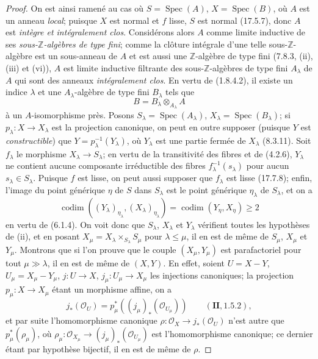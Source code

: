 \begin{proof}
On est ainsi ramené au cas où $S=\operatorname{Spec}(A)$,
$X=\operatorname{Spec}(B)$, où $A$ est un anneau \emph{local}; puisque $X$ est
normal et $f$ lisse, $S$ est normal (17.5.7), donc $A$ est \emph{intègre et
intégralement clos}. Considérons alors $A$ comme limite inductive de ses
\emph{sous-$\mathbb Z$-algèbres de type fini}; comme la clôture intégrale d'une telle
sous-$\mathbb Z$-algèbre est un sous-anneau de $A$ et est aussi une
$\mathbb Z$-algèbre de type fini (7.8.3, (ii), (iii) et (vi)), $A$ est limite inductive
filtrante des sous-$\mathbb Z$-algèbres de type fini $A_\lambda$ de $A$ qui sont des
anneaux \emph{intégralement clos}. En vertu de (1.8.4.2), il existe un indice
$\lambda$ et une $A_\lambda$-algèbre de type fini $B_\lambda$ tels que
\[
  B=B_\lambda\otimes_{A_\lambda}A
\]
à un $A$-isomorphisme près. Posons $S_\lambda=\operatorname{Spec}(A_\lambda)$,
$X_\lambda=\operatorname{Spec}(B_\lambda)$; si $p_\lambda:X\to X_\lambda$ est la
projection canonique, on peut en outre supposer (puisque $Y$ est
\emph{constructible}) que $Y=p_\lambda^{-1}(Y_\lambda)$, où $Y_\lambda$ est une
partie fermée de $X_\lambda$ (8.3.11). Soit $f_\lambda$ le morphisme
$X_\lambda\to S_\lambda$; en vertu de la transitivité des fibres et de (4.2.6),
$Y_\lambda$ ne contient aucune composante irréductible des fibres
$f_\lambda^{-1}(s_\lambda)$ pour aucun $s_\lambda\in S_\lambda$. Puisque $f$ est
lisse, on peut aussi supposer que $f_\lambda$ est lisse (17.7.8); enfin, l'image du
point générique $\eta$ de $S$ dans $S_\lambda$ est le point générique $\eta_\lambda$
de $S_\lambda$, et on a
\[
  \operatorname{codim}((Y_\lambda)_{\eta_\lambda},
  (X_\lambda)_{\eta_\lambda})
  =\operatorname{codim}(Y_\eta,X_\eta)\geq2
\]
en vertu de (6.1.4). On voit donc que $S_\lambda$, $X_\lambda$ et $Y_\lambda$
vérifient toutes les hypothèses de (ii), et en posant
$X_\mu=X_\lambda\times_{S_\lambda}S_\mu$ pour $\lambda\leq\mu$, il en est de même de
$S_\mu$, $X_\mu$ et $Y_\mu$. Montrons que si l'on prouve que le couple
$(X_\mu,Y_\mu)$ est parafactoriel pour tout $\mu\gg\lambda$, il en est de même de
$(X,Y)$. En effet, soient $U=X-Y$, $U_\mu=X_\mu-Y_\mu$, $j:U\to X$,
$j_\mu:U_\mu\to X_\mu$ les injections canoniques; la projection
$p_\mu:X\to X_\mu$ étant un morphisme affine, on a
\[
  j_*(\mathcal O_U)=p_\mu^*((j_\mu)_*(\mathcal O_{U_\mu}))
  \qquad(\mathbf{II}, 1.5.2),
\]
et par suite l'homomorphisme canonique
$\rho:\mathcal O_X\to j_*(\mathcal O_U)$ n'est autre que $p_\mu^*(\rho_\mu)$, où
$\rho_\mu:\mathcal O_{X_\mu}\to(j_\mu)_*(\mathcal O_{U_\mu})$ est l'homomorphisme
canonique; ce dernier étant par hypothèse bijectif, il en est de même de $\rho$.

\end{proof}
